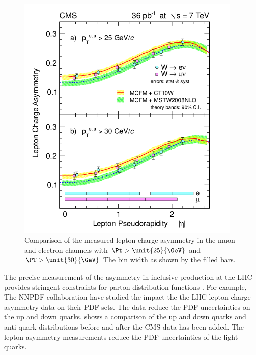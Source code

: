 \begin{figure}[htbp]
  \begin{center}
  \includegraphics*[width=0.95\textwidth]{combined}
  \caption{ Comparison of the measured lepton charge asymmetry in the muon and
electron channels with $\Pt>\unit{25}{\GeV}$ and $\PT>\unit{30}{\GeV}$
The bin width as shown by the filled bars\cite{asym36}.}
  \label{fig:combined}
  \end{center}
\end{figure}

The precise measurement of the asymmetry in inclusive \PW production at the LHC
provides stringent constraints for parton distribution functions \cite{asym840}.
For example, The NNPDF collaboration \cite{Lionetti:2011pw} have studied the
impact the the LHC \PW lepton charge asymmetry data on their PDF
sets\cite{Ball:2011gg}.  The data reduce the PDF uncertainties on the up and
down quarks.  shows a comparison of the up and down
quarks and anti-quark distributions before and after the CMS data has been
added\cite{Ball:2011gg}.  The lepton asymmetry measurements reduce the PDF
uncertainties of the light quarks.

